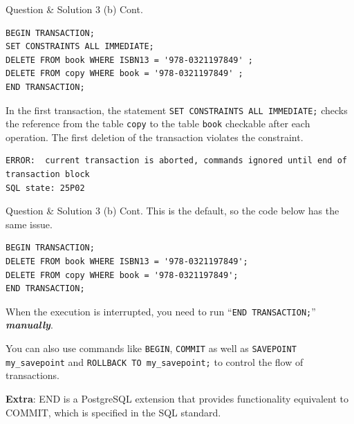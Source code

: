 \begin{frame}[fragile]{Question \& Solution 3 (b) Cont.}
\begin{lstlisting}
BEGIN TRANSACTION;
SET CONSTRAINTS ALL IMMEDIATE;
DELETE FROM book WHERE ISBN13 = '978-0321197849' ;
DELETE FROM copy WHERE book = '978-0321197849' ;
END TRANSACTION;
\end{lstlisting}

In the first transaction, the statement \texttt{SET CONSTRAINTS ALL IMMEDIATE;} checks the reference from the table \texttt{copy} to the table \texttt{book} checkable after each operation. The first deletion of the transaction violates the constraint.

\begin{lstlisting}[style=error]
ERROR:  current transaction is aborted, commands ignored until end of transaction block
SQL state: 25P02
\end{lstlisting}

\end{frame}


\begin{frame}[fragile]{Question \& Solution 3 (b) Cont.}
This is the default, so the code below has the same issue.

\begin{lstlisting}
BEGIN TRANSACTION;
DELETE FROM book WHERE ISBN13 = '978-0321197849';
DELETE FROM copy WHERE book = '978-0321197849';
END TRANSACTION;
\end{lstlisting}

When the execution is interrupted, you need to run ``\texttt{END TRANSACTION;}'' {\color{red} \textbf{\textit{manually}}}. \vspace{5pt}

You can also use commands like \texttt{BEGIN}, \texttt{COMMIT} as well as  \texttt{SAVEPOINT my\_savepoint} and \texttt{ROLLBACK TO my\_savepoint;} to control the flow of transactions.\vspace{5pt}

\textbf{Extra}: END is a PostgreSQL extension that provides functionality equivalent to COMMIT, which is specified in the SQL standard.

\end{frame}


